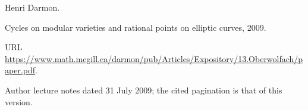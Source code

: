 Henri Darmon.

\newblock Cycles on modular varieties and rational points on elliptic curves,
  2009.

\newblock URL
  \url{https://www.math.mcgill.ca/darmon/pub/Articles/Expository/13.Oberwolfach/paper.pdf}.

\newblock Author lecture notes dated 31 July 2009; the cited pagination is that of this version.
